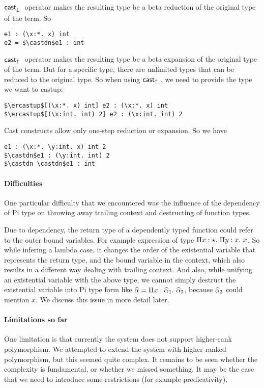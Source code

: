 $\mathsf{cast}_\downarrow^{}~$ operator makes the resulting type be a beta reduction of the
original type of the term. So

\begin{lstlisting}
e1 : (\x:*. x) int
e2 = $\castdn$e1 : int
\end{lstlisting}

$\mathsf{cast}_\uparrow~$ operator makes the resulting type be a beta expansion of
the original type of the term. But for a specific type, there are
unlimited types that can be reduced to the original type. So when
using $\mathsf{cast}_\uparrow~$, we need to provide the type we want to castup:

\begin{lstlisting}
$\ercastup$[(\x:*. x) int] e2 : (\x:*. x) int
$\ercastup$[(\x:int. int) 2] e2 : (\x:int. int) 2
\end{lstlisting}

Cast constructs allow only one-step reduction or expansion. So we have

\begin{lstlisting}
e1 : (\x:*. \y:int. x) int 2
$\castdn$e1 : (\y:int. int) 2
$\castdn \castdn$e1 : int
\end{lstlisting}

\paragraph{Difficulties}

One particular difficulty that we encountered was the influence of the
dependency of Pi type on throwing away trailing context and
destructing of function types.

Due to dependency, the return type of a dependently typed function
could refer to the outer bound variables. For example expression
 of type $\Pi x:\star.~ {\Pi y:x.~ x}$. So while
infering a lambda case, it changes the order of the existential
variable that represents the return type, and the bound variable in
the context, which also results in a different way dealing with
trailing context. And also, while unifying an existential variable
with the above type, we cannot simply destruct the existential
variable into Pi type form like $\widehat{\alpha} = \Pi x:\widehat{\alpha}_1.~ {\widehat{\alpha}_2}$,
because $\widehat{\alpha}_2$ could mention $x$. We discuss this issue 
in more detail later.

\paragraph{Limitations so far}
One limitation is that currently the system does not support
higher-rank polymorphism. We attempted to extend the system
with higher-ranked polymorphism, but this seemed quite complex.
It remains to be seen whether the complexity is fundamental, or
whether we missed something. It may be the case that we need to
introduce some restrictions (for example predicativity).


